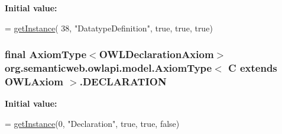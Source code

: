 {\bfseries Initial value\-:}
\begin{DoxyCode}
= \hyperlink{classorg_1_1semanticweb_1_1owlapi_1_1model_1_1_axiom_type_3_01_c_01extends_01_o_w_l_axiom_01_4_a485e011845434c518471707a87f09339}{getInstance}(
            38, \textcolor{stringliteral}{"DatatypeDefinition"}, \textcolor{keyword}{true}, \textcolor{keyword}{true}, \textcolor{keyword}{true})
\end{DoxyCode}
\hypertarget{classorg_1_1semanticweb_1_1owlapi_1_1model_1_1_axiom_type_3_01_c_01extends_01_o_w_l_axiom_01_4_aaf1ac40e27b3a7b1a919fbfefb3dbbd4}{
\subsubsection[{D\-E\-C\-L\-A\-R\-A\-T\-I\-O\-N}]{\setlength{\rightskip}{0pt plus 5cm}final {\bf Axiom\-Type}$<${\bf O\-W\-L\-Declaration\-Axiom}$>$ org.\-semanticweb.\-owlapi.\-model.\-Axiom\-Type$<$ C extends {\bf O\-W\-L\-Axiom} $>$.D\-E\-C\-L\-A\-R\-A\-T\-I\-O\-N\hspace{0.3cm}{\ttfamily [static]}}}\label{classorg_1_1semanticweb_1_1owlapi_1_1model_1_1_axiom_type_3_01_c_01extends_01_o_w_l_axiom_01_4_aaf1ac40e27b3a7b1a919fbfefb3dbbd4}
{\bfseries Initial value\-:}
\begin{DoxyCode}
= \hyperlink{classorg_1_1semanticweb_1_1owlapi_1_1model_1_1_axiom_type_3_01_c_01extends_01_o_w_l_axiom_01_4_a485e011845434c518471707a87f09339}{getInstance}(0,
            \textcolor{stringliteral}{"Declaration"}, \textcolor{keyword}{true}, \textcolor{keyword}{true}, \textcolor{keyword}{false})
\end{DoxyCode}
